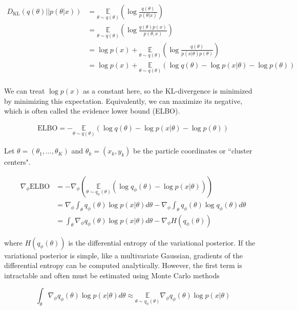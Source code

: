 \documentclass{ucetd}
\begin{document}
\begin{appendices}
\begin{align*}
D_{\mathrm{KL}}(q(\theta)||p(\theta|x)) &= \underset{{\theta \sim q(\theta)}}{\mathbb{E}}\left(\log\frac{q(\theta)}{p(\theta|x)}\right)\\
&=  \underset{{\theta \sim q(\theta)}}{\mathbb{E}}\left(\log\frac{q(\theta)p(x)}{p(\theta,x)}\right)\\
&=  \log p(x) + \underset{{\theta \sim q(\theta)}}{\mathbb{E}}\left(\log\frac{q(\theta)}{p(x|\theta)p(\theta)}\right)\\
&= \log p(x) + \underset{{\theta \sim q(\theta)}}{\mathbb{E}}\left(\log q(\theta) - \log p(x|\theta) - \log p(\theta) \right)\\
\end{align*}

We can treat $\log p(x)$ as a constant here, so the KL-divergence is minimized by minimizing this expectation. Equivalently, we can maximize its negative, which is often called the evidence lower bound (ELBO).

\begin{align}
\mathrm{ELBO} = - \underset{{\theta \sim q(\theta)}}{\mathbb{E}}\left(\log q(\theta) - \log p(x|\theta) - \log p(\theta) \right)
\end{align}

Let $\theta = (\theta_{1},...,\theta_{K})$ and $\theta_{k} = (x_{k},y_{k})$ be the particle coordinates or ``cluster centers". 

\begin{align*}
\nabla_{\phi}\mathrm{ELBO} &= - \nabla_{\phi}\left(\underset{{\theta \sim q_{\phi}(\theta)}}{\mathbb{E}}\left(\log q_{\phi}(\theta) - \log p(x|\theta)\right)\right)\\
&= \nabla_{\phi}\int_{\theta}q_{\phi}(\theta)\log p(x|\theta)d\theta-\nabla_{\phi}\int_{\theta}q_{\phi}(\theta)\log q_{\phi}(\theta)d\theta\\
&= \int_{\theta}\nabla_{\phi}q_{\phi}(\theta)\log p(x|\theta)d\theta-\nabla_{\phi}H(q_{\phi}(\theta))
\end{align*}

where $H(q_{\phi}(\theta))$ is the differential entropy of the variational posterior. If the variational posterior is simple, like a multivariate Gaussian, gradients of the differential entropy can be computed analytically. However, the first term is intractable and often must be estimated using Monte Carlo methods

\begin{equation*}
\int_{\theta}\nabla_{\phi}q_{\phi}(\theta)\log p(x|\theta)d\theta \approx \underset{{\theta \sim q_{\phi}(\theta)}}{\mathbb{E}}\nabla_{\phi}q_{\phi}(\theta)\log p(x|\theta)
\end{equation*}



\end{appendices}
\end{document}
